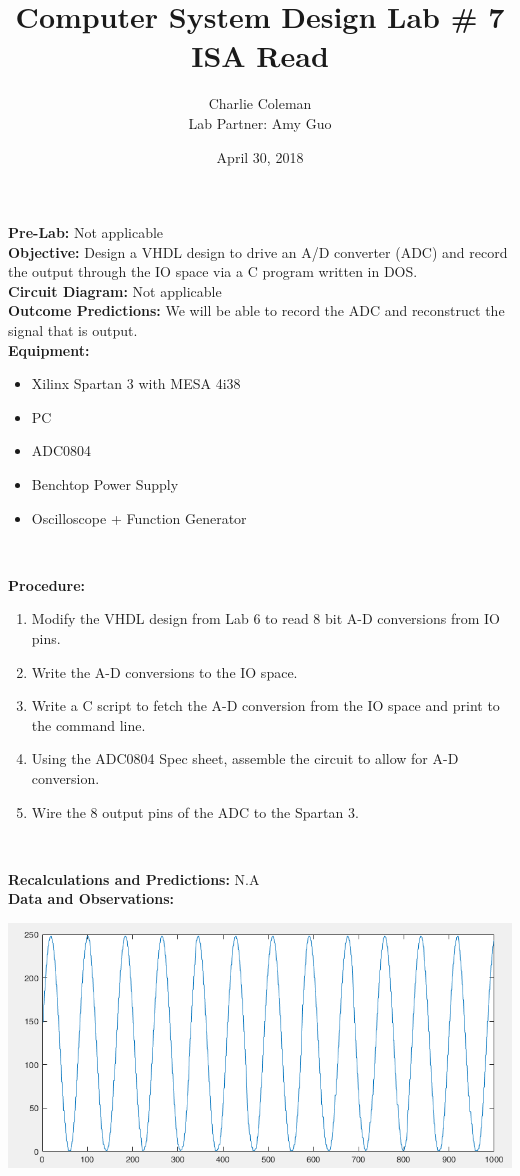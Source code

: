 \documentclass{article}
\title{Computer System Design Lab \# 7\\ISA Read}
\author{Charlie Coleman \\ Lab Partner: Amy Guo}
\date{April 30, 2018}
\newcommand{\sect}[1]{\noindent\textbf{#1}}
\begin{document}
\maketitle
\pagebreak

\sect{Pre-Lab:} Not applicable\\

\sect{Objective:} Design a VHDL design to drive an A/D converter (ADC) and record the output through the IO space via a C program written in DOS.\\

\sect{Circuit Diagram:} Not applicable\\

\sect{Outcome Predictions:} We will be able to record the ADC and reconstruct the signal that is output.\\

\sect{Equipment:}

\begin{itemize}[noitemsep, nolistsep]
	\item Xilinx Spartan 3 with MESA 4i38
	\item PC
	\item ADC0804
	\item Benchtop Power Supply
	\item Oscilloscope + Function Generator
\end{itemize}~

\sect{Procedure:}

\begin{enumerate}
	\item Modify the VHDL design from Lab 6 to read 8 bit A-D conversions from IO pins.
	\item Write the A-D conversions to the IO space.
	\item Write a C script to fetch the A-D conversion from the IO space and print to the command line.
	\item Using the ADC0804 Spec sheet, assemble the circuit to allow for A-D conversion.
	\item Wire the 8 output pins of the ADC to the Spartan 3.
\end{enumerate}~

\sect{Recalculations and Predictions:} N.A\\

\sect{Data and Observations:}

\begin{center}\includegraphics[width=\textwidth]{plot}\end{center}
\end{document}
